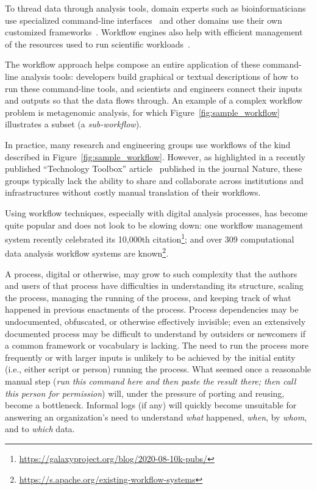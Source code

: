 To thread data through analysis tools, domain experts such as bioinformaticians use specialized command-line interfaces~\cite{seemann_ten_2013,georgeson_bionitio_2019} and other domains use their own customized frameworks~\cite{babuji_parsl_2019,berthold_knime_2009}. Workflow engines also help with efficient management of the resources used to run scientific workloads~\cite{deelman_pegasus_2015,couvares_workflow_2007}.

The workflow approach helps compose an entire application of these command-line analysis tools: developers build graphical or textual descriptions of how to run these command-line tools, and scientists and engineers connect their inputs and outputs so that the data flows through. An example of a complex workflow problem is metagenomic analysis, for which Figure~\ref{fig:sample_workflow} illustrates a subset (a \textit{sub-workflow}).

In practice, many research and engineering groups use workflows of the kind described in Figure~\ref{fig:sample_workflow}. However, as highlighted in a recently published ``Technology Toolbox'' article~\cite{perkel_workflow_2019} published in the journal Nature, these groups typically lack the ability to share and collaborate across institutions and infrastructures without costly manual translation of their workflows.

Using workflow techniques, especially with digital analysis processes, has become quite popular and does not look to be slowing down: one workflow management system recently celebrated its 10,000th citation\footnote{\url{https://galaxyproject.org/blog/2020-08-10k-pubs/}}; and over 309 computational data analysis workflow systems are known\footnote{\url{https://s.apache.org/existing-workflow-systems}}.

A process, digital or otherwise, may grow to such complexity that the authors and users of that process have difficulties in understanding its structure, scaling the process, managing the running of the process, and keeping track of what happened in previous enactments of the process. Process dependencies may be undocumented, obfuscated, or otherwise effectively invisible; even an extensively documented process may be difficult to understand by outsiders or newcomers if a common framework or vocabulary is lacking. The need to run the process more frequently or with larger inputs is unlikely to be achieved  by the initial entity (i.e., either script or person) running the process. What seemed once a reasonable manual step (\textit{run this command here and then paste the result there; then call this person for permission}) will, under the pressure of porting and reusing, become a bottleneck. Informal logs (if any) will quickly become unsuitable for answering an organization's need to understand \textit{what} happened, \textit{when}, by \textit{whom}, and to \textit{which} data.


